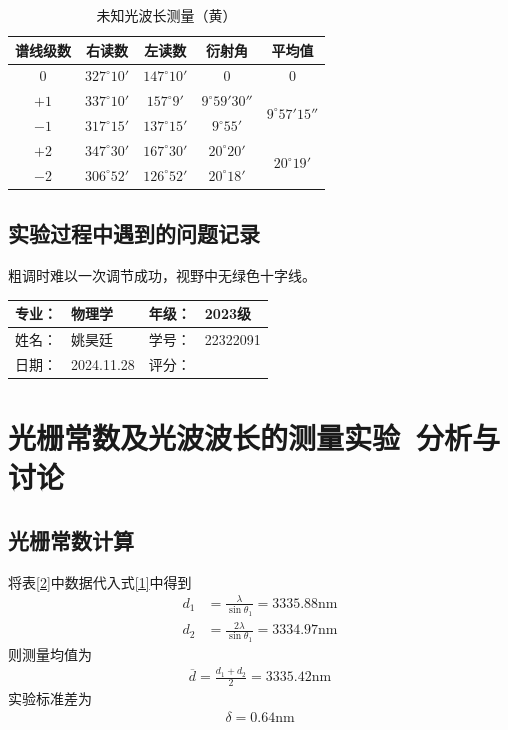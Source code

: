 \documentclass[dvipsnames, svgnames,a4paper,11pt]{article}
\begin{document}
\begin{table}[H]
	\centering
	\caption{未知光波长测量（黄）}
	\label{5}
	\begin{tabular}{ccccc}
		\toprule
		谱线级数&右读数&左读数&衍射角&平均值\\
		\midrule
		0&$327^\circ10'$&$147^\circ10'$&0&0\\
		\midrule
		$+1$&$337^\circ10'$&$157^\circ9'$&$9^\circ59'30''$&\multirow{2}{*}{$9^\circ57'15''$}\\
		 
		$-1$&$317^\circ15'$&$137^\circ15'$&$9^\circ55'$&\\
		\midrule
		$+2$&$347^\circ30'$&$167^\circ30'$&$20^\circ20'$&\multirow{2}{*}{$20^\circ19'$}\\
		 
		$-2$&$306^\circ52'$&$126^\circ52'$&$20^\circ18'$&\\
		\toprule
	\end{tabular}
\end{table}
\subsection{实验过程中遇到的问题记录}
粗调时难以一次调节成功，视野中无绿色十字线。


\clearpage
{}
\begin{table}
	\renewcommand\arraystretch{1.7}
	\begin{tabularx}{\textwidth}{|X|X|X|X|}
	\hline
	专业：& 物理学 &年级：& 2023级\\
	\hline
	姓名： &姚昊廷& 学号：&22322091 \\
	\hline
    日期：&2024.11.28 & 评分： &\\
	\hline
	\end{tabularx}
\end{table}

\section{光栅常数及光波波长的测量实验\ \textbf{分析与讨论}}
\subsection{光栅常数计算}
 将表\ref{2}中数据代入式\ref{1}中得到
 \begin{align*}
	d_1&=\frac{\lambda}{\sin\theta_1}=3335.88\text{nm}\\
	d_2&=\frac{2\lambda}{\sin\theta_1}=3334.97\text{nm}
 \end{align*}
 则测量均值为
 \begin{align*}
	\overline{d}=\frac{d_1+d_2}{2}=3335.42\text{nm}
 \end{align*}
 实验标准差为
 \begin{align*}
	\delta=0.64\text{nm}
 \end{align*}
\end{document}

